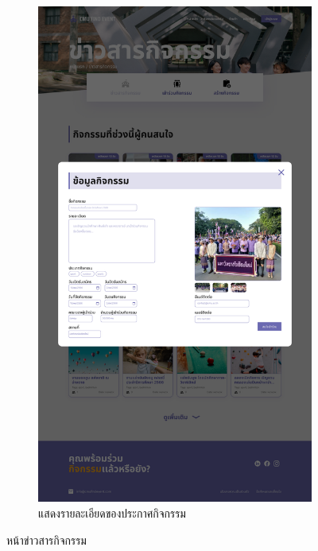 \begin{figure}[h]
\begin{subfigure}[b]{0.3\linewidth}
    \includegraphics[width=\linewidth]{image/Figma-design/Event-info-1.png}
    \caption{แสดงรายละเอียดของประกาศกิจกรรม}
  \end{subfigure}
  \caption{หน้าข่าวสารกิจกรรม}
  \label{fig:event-info}
\end{figure}

